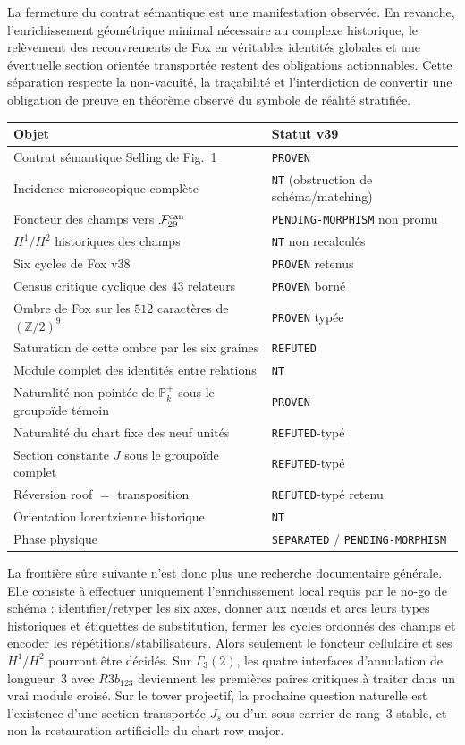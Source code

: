\documentclass[11pt,a4paper]{article}
\newcommand{\certProven}{\texttt{PROVEN}}
\newcommand{\certRefuted}{\texttt{REFUTED}}
\newcommand{\certSeparated}{\texttt{SEPARATED}}
\newcommand{\certPending}{\texttt{PENDING-MORPHISM}}
\newcommand{\certNT}{\texttt{NT}}
\begin{document}
La fermeture du contrat sémantique est une manifestation observée. En revanche, l'enrichissement géométrique minimal nécessaire au complexe historique, le relèvement des recouvrements de Fox en véritables identités globales et une éventuelle section orientée transportée restent des obligations actionnables. Cette séparation respecte la non-vacuité, la traçabilité et l'interdiction de convertir une obligation de preuve en théorème observé du symbole de réalité stratifiée.

\begin{center}
\begin{tabularx}{\textwidth}{@{}Xl@{}}
\toprule
Objet & Statut v39\\
\midrule
Contrat sémantique Selling de Fig.~1 & \certProven\\
Incidence microscopique complète & \certNT{} (obstruction de schéma/matching)\\
Foncteur des champs vers $\mathcal F_{29}^{\rm can}$ & \certPending{} non promu\\
$H^1/H^2$ historiques des champs & \certNT{} non recalculés\\
Six cycles de Fox v38 & \certProven{} retenus\\
Census critique cyclique des $43$ relateurs & \certProven{} borné\\
Ombre de Fox sur les $512$ caractères de $(\mathbb Z/2)^9$ & \certProven{} typée\\
Saturation de cette ombre par les six graines & \certRefuted\\
Module complet des identités entre relations & \certNT\\
Naturalité non pointée de $\mathbb P_k^+$ sous le groupoïde témoin & \certProven\\
Naturalité du chart fixe des neuf unités & \certRefuted{}-typé\\
Section constante $J$ sous le groupoïde complet & \certRefuted{}-typé\\
Réversion roof $=$ transposition & \certRefuted{}-typé retenu\\
Orientation lorentzienne historique & \certNT\\
Phase physique & \certSeparated{} / \certPending\\
\bottomrule
\end{tabularx}
\end{center}

La frontière sûre suivante n'est donc plus une recherche documentaire générale. Elle consiste à effectuer uniquement l'enrichissement local requis par le no-go de schéma : identifier/retyper les six axes, donner aux nœuds et arcs leurs types historiques et étiquettes de substitution, fermer les cycles ordonnés des champs et encoder les répétitions/stabilisateurs. Alors seulement le foncteur cellulaire et ses $H^1/H^2$ pourront être décidés. Sur $\Gamma_3(2)$, les quatre interfaces d'annulation de longueur~$3$ avec $R3b_{123}$ deviennent les premières paires critiques à traiter dans un vrai module croisé. Sur le tower projectif, la prochaine question naturelle est l'existence d'une section transportée $J_s$ ou d'un sous-carrier de rang~$3$ stable, et non la restauration artificielle du chart row-major.
\end{document}
